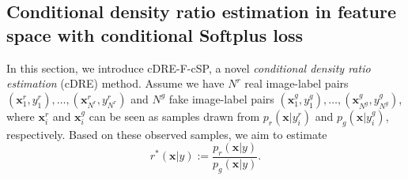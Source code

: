 \documentclass[final,12pt, 3p,times]{elsarticle}
\begin{document}
\subsection{Conditional density ratio estimation in feature space with conditional Softplus loss} \label{sec:cDRE-F-cSP}
In this section, we introduce cDRE-F-cSP, a novel \textit{conditional density ratio estimation} (cDRE) method. Assume we have $N^r$ real image-label pairs $(\bm{x}_1^r, y_1^r),  \dots, (\bm{x}_{N^r}^r, y_{N^r}^r)$ and $N^g$ fake image-label pairs $(\bm{x}_1^g, y_1^g), \dots, (\bm{x}_{N^g}^g, y_{N^g}^g)$, where $\bm{x}_i^r$ and $\bm{x}_i^g$ can be seen as samples drawn from $p_r(\bm{x}|y_i^r)$ and $p_g(\bm{x}|y_i^g)$, respectively. Based on these observed samples, we aim to estimate
\begin{equation}
    \label{eq:true_density_ratio_function}
    r^*(\bm{x}|y):=\frac{p_r(\bm{x}|y)}{p_g(\bm{x}|y)}.
\end{equation}
\end{document}
